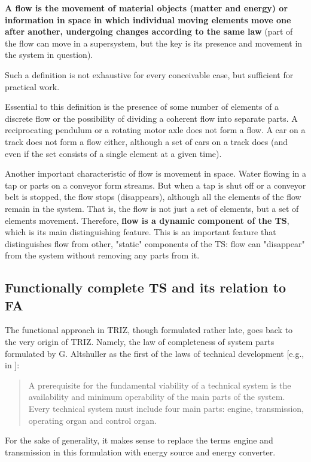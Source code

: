 \documentclass[a4paper,11pt]{article}
\begin{document}

\textbf{A flow is the movement of material objects (matter and energy) or
  information in space in which individual moving elements move one after
  another, undergoing changes according to the same law} (part of the flow can
move in a supersystem, but the key is its presence and movement in the system
in question).

Such a definition is not exhaustive for every conceivable case, but sufficient
for practical work.

Essential to this definition is the presence of some number of elements of a
discrete flow or the possibility of dividing a coherent flow into separate
parts. A reciprocating pendulum or a rotating motor axle does not form a
flow. A car on a track does not form a flow either, although a set of cars on
a track does (and even if the set consists of a single element at a given
time).

Another important characteristic of flow is movement in space. Water flowing
in a tap or parts on a conveyor form streams. But when a tap is shut off or a
conveyor belt is stopped, the flow stops (disappears), although all the
elements of the flow remain in the system. That is, the flow is not just a set
of elements, but a set of elements movement. Therefore, \textbf{flow is a
  dynamic component of the TS}, which is its main distinguishing feature. This
is an important feature that distinguishes flow from other, "static"
components of the TS: flow can "disappear" from the system without removing
any parts from it.

\subsection{Functionally complete TS and its relation to FA}

The functional approach in TRIZ, though formulated rather late, goes back to
the very origin of TRIZ. Namely, the law of completeness of system parts
formulated by G. Altshuller as the first of the laws of technical development
[e.g., in \cite{B1}]:
\begin{quote}
  A prerequisite for the fundamental viability of a technical system is the
  availability and minimum operability of the main parts of the system. Every
  technical system must include four main parts: engine, transmission,
  operating organ and control organ.
\end{quote}

For the sake of generality, it makes sense to replace the terms engine and
transmission in this formulation with energy source and energy converter.
\end{document}
